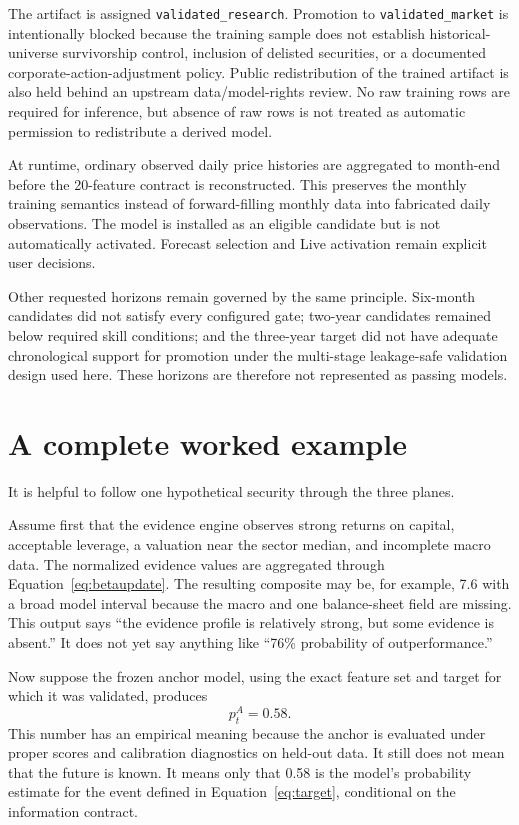 \documentclass[11pt]{article}
\begin{document}
The artifact is assigned \texttt{validated\_research}. Promotion to \texttt{validated\_market} is intentionally blocked because the training sample does not establish historical-universe survivorship control, inclusion of delisted securities, or a documented corporate-action-adjustment policy. Public redistribution of the trained artifact is also held behind an upstream data/model-rights review. No raw training rows are required for inference, but absence of raw rows is not treated as automatic permission to redistribute a derived model.

At runtime, ordinary observed daily price histories are aggregated to month-end before the 20-feature contract is reconstructed. This preserves the monthly training semantics instead of forward-filling monthly data into fabricated daily observations. The model is installed as an eligible candidate but is not automatically activated. Forecast selection and Live activation remain explicit user decisions.

Other requested horizons remain governed by the same principle. Six-month candidates did not satisfy every configured gate; two-year candidates remained below required skill conditions; and the three-year target did not have adequate chronological support for promotion under the multi-stage leakage-safe validation design used here. These horizons are therefore not represented as passing models.

\section{A complete worked example}
\label{sec:worked}

It is helpful to follow one hypothetical security through the three planes.

Assume first that the evidence engine observes strong returns on capital, acceptable leverage, a valuation near the sector median, and incomplete macro data. The normalized evidence values are aggregated through Equation~\eqref{eq:betaupdate}. The resulting composite may be, for example, 7.6 with a broad model interval because the macro and one balance-sheet field are missing. This output says ``the evidence profile is relatively strong, but some evidence is absent.'' It does not yet say anything like ``76\% probability of outperformance.''

Now suppose the frozen anchor model, using the exact feature set and target for which it was validated, produces
\begin{equation}
p_t^A=0.58.
\end{equation}
This number has an empirical meaning because the anchor is evaluated under proper scores and calibration diagnostics on held-out data. It still does not mean that the future is known. It means only that 0.58 is the model's probability estimate for the event defined in Equation~\eqref{eq:target}, conditional on the information contract.
\end{document}
